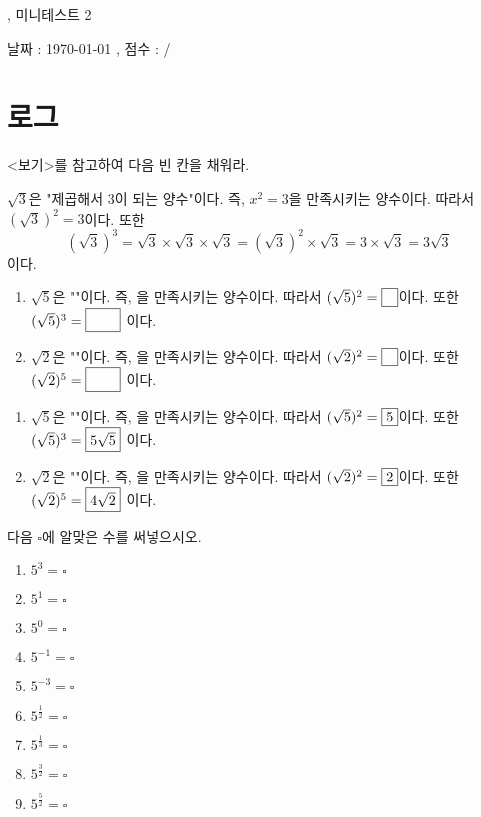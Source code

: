 \documentclass[a4paper]{oblivoir}
\begin{document}
\begin{center}
, 미니테스트 2
\end{center}
\begin{center}
날짜 : \today
,\qquad
점수 :  / 
\end{center}

\section{로그}

\begin{Exercise}
<보기>를 참고하여 다음 빈 칸을 채워라.
\begin{mdframed}[frametitle=<보기>]
\(\sqrt3\)은 "제곱해서 3이 되는 양수"이다.
즉, \(x^2=3\)을 만족시키는 양수이다.
따라서 \((\sqrt3)^2=3\)이다.
또한
\[(\sqrt3)^3=\sqrt3\times\sqrt3\times\sqrt3=(\sqrt3)^2\times\sqrt3=3\times\sqrt3=3\sqrt3\]
이다.
\end{mdframed}
\begin{enumerate}[(1)]
\item
\(\sqrt5\)은 ""이다.
즉, 을 만족시키는 양수이다.
따라서 \((\sqrt5)^2=\pb{5}\)이다.
또한
\((\sqrt5)^3=\pb{$5\sqrt5$}\)
이다.
\item
\(\sqrt2\)은 ""이다.
즉, 을 만족시키는 양수이다.
따라서 \((\sqrt2)^2=\pb{2}\)이다.
또한
\((\sqrt2)^5=\pb{$4\sqrt2$}\)
이다.
\end{enumerate}
\end{Exercise}

\begin{Answer}
\begin{enumerate}[(1)]
\item
\(\sqrt5\)은 ""이다.
즉, 을 만족시키는 양수이다.
따라서 \((\sqrt5)^2=\fbox{5}\)이다.
또한
\((\sqrt5)^3=\fbox{$5\sqrt5$}\)
이다.
\item
\(\sqrt2\)은 ""이다.
즉, 을 만족시키는 양수이다.
따라서 \((\sqrt2)^2=\fbox{2}\)이다.
또한
\((\sqrt2)^5=\fbox{$4\sqrt2$}\)
이다.
\end{enumerate}
\end{Answer}

\begin{Exercise}
다음 \(\square\)에 알맞은 수를 써넣으시오.
\begin{enumerate}[(1)]
\item
\(5^3=\square\)
\item
\(5^1=\square\)
\item
\(5^0=\square\)
\item
\(5^{-1}=\square\)
\item
\(5^{-3}=\square\)
\item
\(5^{\frac12}=\square\)
\item
\(5^{\frac13}=\square\)
\item
\(5^{\frac32}=\square\)
\item
\(5^{\frac52}=\square\)
\end{enumerate}
\end{Exercise}
\end{document}
